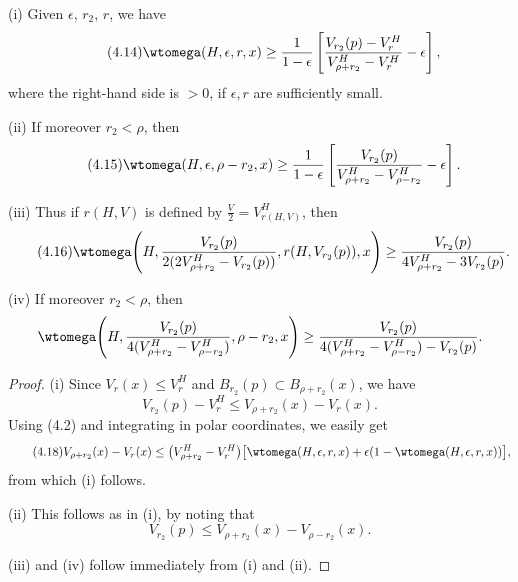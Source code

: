 \begin{proposition}
\label{prop:refined-injectivity-angle-lower-estimates}

\textup{(i)} Given $\epsilon$, $r_2$, $r$, we have
\begin{equation}\tag{4.14}
\wtomega(H,\epsilon,r,x)\ge \frac{1}{1-\epsilon}
\left[\frac{V_{r_2}(p)-V_r^H}{V^H_{\rho+r_2}-V_r^H}-\epsilon\right],
\end{equation}
where the right-hand side is $>0$, if $\epsilon,r$ are sufficiently small.

\textup{(ii)} If moreover $r_2<\rho$, then
\begin{equation}\tag{4.15}
\wtomega(H,\epsilon,\rho-r_2,x)\ge \frac{1}{1-\epsilon}
\left[\frac{V_{r_2}(p)}{V^H_{\rho+r_2}-V^H_{\rho-r_2}}-\epsilon\right].
\end{equation}

\textup{(iii)} Thus if $r(H,V)$ is defined by $\frac{V}{2}=V^H_{r(H,V)}$, then
\begin{equation}\tag{4.16}
\wtomega\!\left(H,\frac{V_{r_2}(p)}{2(2V^H_{\rho+r_2}-V_{r_2}(p))},r(H,V_{r_2}(p)),x\right)
\ge \frac{V_{r_2}(p)}{4V^H_{\rho+r_2}-3V_{r_2}(p)}.
\end{equation}

\textup{(iv)} If moreover $r_2<\rho$, then
\[
\wtomega\!\left(H,\frac{V_{r_2}(p)}{4(V^H_{\rho+r_2}-V^H_{\rho-r_2})},\rho-r_2,x\right)
\ge \frac{V_{r_2}(p)}{4(V^H_{\rho+r_2}-V_{\rho-r_2}^H)-V_{r_2}(p)}.
\]
\end{proposition}

\begin{proof}
\textup{(i)} Since $V_r(x)\le V_r^H$ and $B_{r_2}(p)\subset B_{\rho+r_2}(x)$, we have
\begin{equation}\tag{4.17}
V_{r_2}(p)-V_r^H\le V_{\rho+r_2}(x)-V_r(x).
\end{equation}
Using (4.2) and integrating in polar coordinates, we easily get
\begin{equation}\tag{4.18}
V_{\rho+r_2}(x)-V_r(x)\le
\bigl(V^H_{\rho+r_2}-V_r^H\bigr)\bigl[\wtomega(H,\epsilon,r,x)+\epsilon(1-\wtomega(H,\epsilon,r,x))\bigr],
\end{equation}
from which (i) follows.

\textup{(ii)} This follows as in (i), by noting that
\begin{equation}
\tag{4.19}
V_{r_2}(p) \leq V_{\rho+r_2}(x) - V_{\rho-r_2}(x).
\end{equation}

\textup{(iii)} and (iv) follow immediately from (i) and (ii).
\end{proof}

